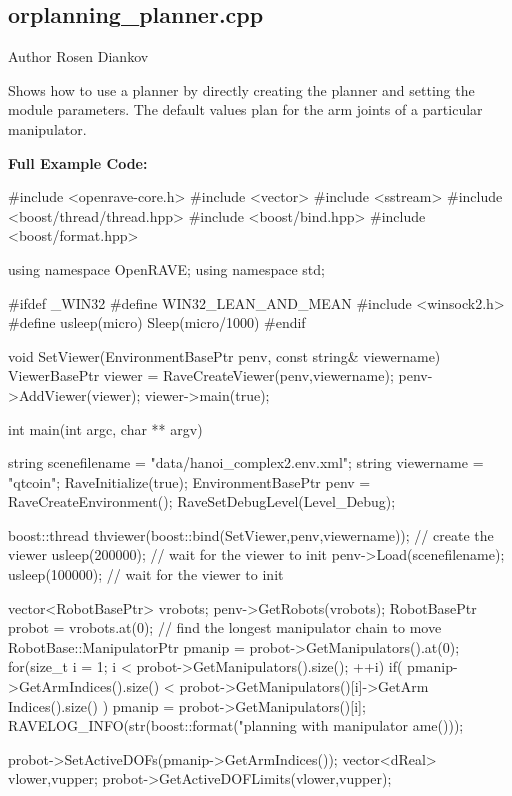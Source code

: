 \hypertarget{orplanning__planner.cpp-example}{
\subsection{orplanning\_\-planner.cpp}
}
\begin{DoxyAuthor}{Author}
Rosen Diankov
\end{DoxyAuthor}
Shows how to use a planner by directly creating the planner and setting the module parameters. The default values plan for the arm joints of a particular manipulator.

{\bfseries Full Example Code:}


\begin{DoxyCodeInclude}

#include <openrave-core.h>
#include <vector>
#include <sstream>
#include <boost/thread/thread.hpp>
#include <boost/bind.hpp>
#include <boost/format.hpp>

using namespace OpenRAVE;
using namespace std;

#ifdef _WIN32
#define WIN32_LEAN_AND_MEAN
#include <winsock2.h>
#define usleep(micro) Sleep(micro/1000)
#endif

void SetViewer(EnvironmentBasePtr penv, const string& viewername)
{
    ViewerBasePtr viewer = RaveCreateViewer(penv,viewername);
    penv->AddViewer(viewer);
    viewer->main(true);
}

int main(int argc, char ** argv)
{
    string scenefilename = "data/hanoi_complex2.env.xml";
    string viewername = "qtcoin";
    RaveInitialize(true);
    EnvironmentBasePtr penv = RaveCreateEnvironment();
    RaveSetDebugLevel(Level_Debug);

    boost::thread thviewer(boost::bind(SetViewer,penv,viewername)); // create the
       viewer
    usleep(200000); // wait for the viewer to init
    penv->Load(scenefilename);
    usleep(100000); // wait for the viewer to init

    vector<RobotBasePtr> vrobots;
    penv->GetRobots(vrobots);
    RobotBasePtr probot = vrobots.at(0);
    // find the longest manipulator chain to move
    RobotBase::ManipulatorPtr pmanip = probot->GetManipulators().at(0);
    for(size_t i = 1; i < probot->GetManipulators().size(); ++i) {
        if( pmanip->GetArmIndices().size() < probot->GetManipulators()[i]->GetArm
      Indices().size() ) {
            pmanip = probot->GetManipulators()[i];
        }
    }
    RAVELOG_INFO(str(boost::format("planning with manipulator %
      ame()));

    probot->SetActiveDOFs(pmanip->GetArmIndices());
    vector<dReal> vlower,vupper;
    probot->GetActiveDOFLimits(vlower,vupper);

}
\end{DoxyCodeInclude}
